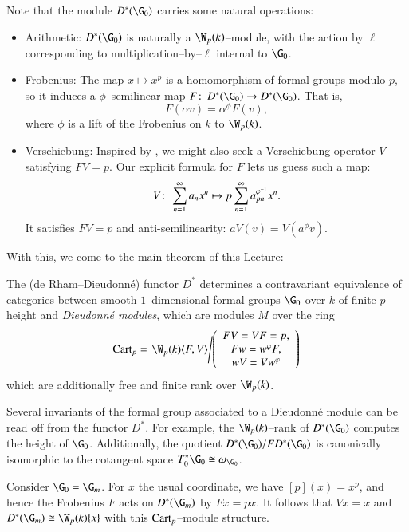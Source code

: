 Note that the module $D^*(\G_0)$ carries some natural operations:
\begin{itemize}
\item Arithmetic: $D^*(\G_0)$ is naturally a $\W_p(k)$--module, with the action by $\ell$ corresponding to multiplication--by--$\ell$ internal to $\G_0$.
\item {}Frobenius: The map $x \mapsto x^p$ is a homomorphism of formal groups modulo $p$, so it induces a $\phi$--semilinear map $F\co D^*(\G_0) \to D^*(\G_0)$.  That is, \[F(\alpha v) = \alpha^\phi F(v),\] where $\phi$ is a lift of the Frobenius on $k$ to $\W_p(k)$.
\item {}Verschiebung: Inspired by , we might also seek a Verschiebung operator $V$ satisfying $FV = p$.  Our explicit formula for $F$ lets us guess such a map: \[V\colon\thinspace \sum_{n=1}^\infty a_n x^n \mapsto p \sum_{n=1}^\infty a_{pn}^{\varphi^{-1}} x^n.\]  It satisfies $FV = p$ and anti-semilinearity: $aV(v) = V(a^\phi v)$.
\end{itemize}
With this, we come to the main theorem of this Lecture:

\begin{theorem}\label{MainContraDieudonneThm}
The (de Rham--Dieudonn\'e) functor $D^*$ determines a contravariant equivalence of categories between smooth $1$--dimensional formal groups $\G_0$ over $k$ of finite $p$--height and \textit{Dieudonn\'e modules}, which are modules $M$ over the ring \[\Cart_p = \left. \W_p(k)\<F,V\> \middle/ \left( \begin{array}{c} FV = VF = p, \\ Fw = w^\phi F, \\ wV = Vw^\phi \end{array} \right) \right.\] which are additionally free and finite rank over $\W_p(k)$.
\end{theorem}

\begin{remark}
Several invariants of the formal group associated to a Dieudonn\'e module can be read off from the functor $D^*$.  For example, the $\W_p(k)$--rank of $D^*(\G_0)$ computes the height of $\G_0$.  Additionally, the quotient $D^*(\G_0) / FD^*(\G_0)$ is canonically isomorphic to the cotangent space $T_0^* \G_0 \cong \omega_{\G_0}$.
\end{remark}

\begin{example}
Consider $\G_0 = \G_m$.  For $x$ the usual coordinate, we have $[p](x) = x^p$, and hence the Frobenius $F$ acts on $D^*(\G_m)$ by $Fx = px$.  It follows that $Vx = x$ and $D^*(\G_m) \cong \W_p(k)\{x\}$ with this $\mathrm{Cart}_p$--module structure.
\end{example}

